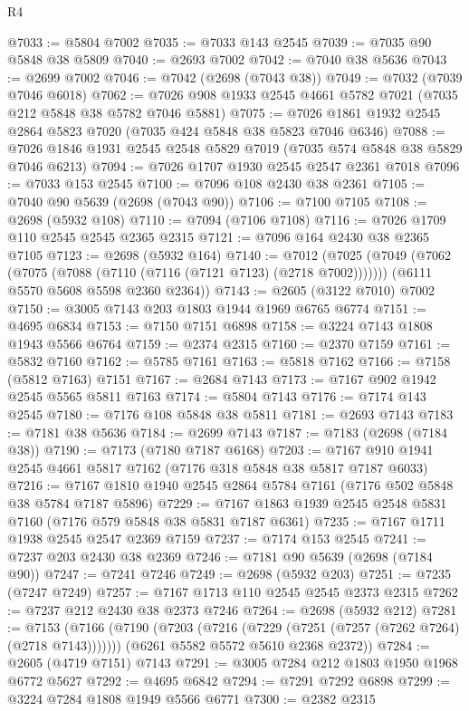 \begin{lexlean}{R4}
\begin{coremodule}
@7033 := @5804 @7002
@7035 := @7033 @143 @2545
@7039 := @7035 @90 @5848 @38 @5809
@7040 := @2693 @7002
@7042 := @7040 @38 @5636
@7043 := @2699 @7002
@7046 := @7042 (@2698 (@7043 @38))
@7049 := @7032 (@7039 @7046 @6018)
@7062 := @7026 @908 @1933 @2545 @4661 @5782 @7021 (@7035 @212 @5848 @38 @5782 @7046 @5881)
@7075 := @7026 @1861 @1932 @2545 @2864 @5823 @7020 (@7035 @424 @5848 @38 @5823 @7046 @6346)
@7088 := @7026 @1846 @1931 @2545 @2548 @5829 @7019 (@7035 @574 @5848 @38 @5829 @7046 @6213)
@7094 := @7026 @1707 @1930 @2545 @2547 @2361 @7018
@7096 := @7033 @153 @2545
@7100 := @7096 @108 @2430 @38 @2361
@7105 := @7040 @90 @5639 (@2698 (@7043 @90))
@7106 := @7100 @7105
@7108 := @2698 (@5932 @108)
@7110 := @7094 (@7106 @7108)
@7116 := @7026 @1709 @110 @2545 @2545 @2365 @2315
@7121 := @7096 @164 @2430 @38 @2365 @7105
@7123 := @2698 (@5932 @164)
@7140 := @7012
    (@7025
      (@7049 (@7062 (@7075 (@7088 (@7110 (@7116 (@7121 @7123) (@2718 @7002)))))))
      (@6111 @5570 @5608 @5598 @2360 @2364))
@7143 := @2605 (@3122 @7010) @7002
@7150 := @3005 @7143 @203 @1803 @1944 @1969 @6765 @6774
@7151 := @4695 @6834
@7153 := @7150 @7151 @6898
@7158 := @3224 @7143 @1808 @1943 @5566 @6764
@7159 := @2374 @2315
@7160 := @2370 @7159
@7161 := @5832 @7160
@7162 := @5785 @7161
@7163 := @5818 @7162
@7166 := @7158 (@5812 @7163) @7151
@7167 := @2684 @7143
@7173 := @7167 @902 @1942 @2545 @5565 @5811 @7163
@7174 := @5804 @7143
@7176 := @7174 @143 @2545
@7180 := @7176 @108 @5848 @38 @5811
@7181 := @2693 @7143
@7183 := @7181 @38 @5636
@7184 := @2699 @7143
@7187 := @7183 (@2698 (@7184 @38))
@7190 := @7173 (@7180 @7187 @6168)
@7203 := @7167 @910 @1941 @2545 @4661 @5817 @7162 (@7176 @318 @5848 @38 @5817 @7187 @6033)
@7216 := @7167 @1810 @1940 @2545 @2864 @5784 @7161 (@7176 @502 @5848 @38 @5784 @7187 @5896)
@7229 := @7167 @1863 @1939 @2545 @2548 @5831 @7160 (@7176 @579 @5848 @38 @5831 @7187 @6361)
@7235 := @7167 @1711 @1938 @2545 @2547 @2369 @7159
@7237 := @7174 @153 @2545
@7241 := @7237 @203 @2430 @38 @2369
@7246 := @7181 @90 @5639 (@2698 (@7184 @90))
@7247 := @7241 @7246
@7249 := @2698 (@5932 @203)
@7251 := @7235 (@7247 @7249)
@7257 := @7167 @1713 @110 @2545 @2545 @2373 @2315
@7262 := @7237 @212 @2430 @38 @2373 @7246
@7264 := @2698 (@5932 @212)
@7281 := @7153
    (@7166
      (@7190 (@7203 (@7216 (@7229 (@7251 (@7257 (@7262 @7264) (@2718 @7143)))))))
      (@6261 @5582 @5572 @5610 @2368 @2372))
@7284 := @2605 (@4719 @7151) @7143
@7291 := @3005 @7284 @212 @1803 @1950 @1968 @6772 @5627
@7292 := @4695 @6842
@7294 := @7291 @7292 @6898
@7299 := @3224 @7284 @1808 @1949 @5566 @6771
@7300 := @2382 @2315

\end{coremodule}
\end{lexlean}
